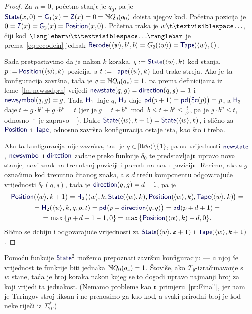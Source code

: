 \begin{proof}
Za $n=0$, početno stanje je $q_0$, pa je $\f{State}(x,0)=\f G_1(x)=\f Z(x)=0=\N Q_0(q_0)$ doista njegov kod. Početna pozicija je $0=\f Z(x)=\f G_2(x)=\f{Position}(x,0)$. Početna traka je $w\bl\ldots$, čiji kod $\knk{w\bl\ldots}$ je prema~\eqref{eq:recodein} jednak $\f{Recode}(\kr w,b',b)=G_3(\kr w)=\f{Tape}(\kr w,0)$.

Sada pretpostavimo da je nakon $k$ koraka, $q:=\f{State}(\kr w,k)$ kod stanja, $p:=\f{Position}(\kr w,k)$ pozicija, a $t:=\f{Tape}(\kr w,k)$ kod trake stroja. Ako je ta konfiguracija završna, tada je $q={\mathbb N} Q_0(q_z)=1$, pa prema definicijama iz leme~\ref{lm:newssdprn} vrijedi $\f{newstate}(q,g)=\f{direction}(q,g)=1$ i $\f{newsymbol}(q,g)=g$. Tada $\f H_1$ daje $q$, $\f H_2$ daje $\f{pd}(p+1)=\f{pd}\bigl(\f{Sc}(p)\bigr)=p$, a $\f H_3$ daje $t\dotminus g\cdot b^p+g\cdot b^p=t$ (jer je $g=t\div b^p\bmod b\le t\div b^p\le\frac{t}{b^p}$, pa je $g\cdot b^p\le t$, odnosno $\dotminus$ je zapravo $-$). Dakle $\f{State}(\kr w,k+1)=\f{State}(\kr w,k)$, i slično za $\f{Position}$ i $\f{Tape}$, odnosno završna konfiguracija ostaje ista, kao što i treba.

Ako ta konfiguracija nije završna, tad je $q\in[0\dd a\rangle\setminus\{1\}$, pa su vrijednosti $\f{newstate}$, $\f{newsymbol}$ i $\f{direction}$ zadane preko funkcije $\delta_0$ te predstavljaju upravo novo stanje, novi znak na trenutnoj poziciji i pomak na novu poziciju. Recimo, ako s $g$ označimo kod trenutno čitanog znaka, a s $d$ treću komponentu odgovarajuće vrijednosti $\delta_0(q,g)$, tada je $\f{direction}(q,g)=d+1$, pa je
\begin{multline}
    \f{Position}(\kr w,k+1)=\f H_2\bigl(\kr w,k,\f{State}(\kr w,k),\f{Position}(\kr w, k),\f{Tape}(\kr w,k)\bigr)=\\
    =\f H_2(\kr w,k,q,p,t)=
    \f{pd}\bigl(p+\f{direction}(q,g)\bigr)=\f{pd}(p+d+1)=\\
    =\max\,\{p+d+1-1,0\}=\max\,\{\f{Position}(\kr w,k)+d,0\}\text.
\end{multline}
Slično se dobiju i odgovarajuće vrijednosti za $\f{State}(\kr w,k+1)$ i $\f{Tape}(\kr w,k+1)$.
\end{proof}


Pomoću funkcije $\f{State}^2$ možemo prepoznati završnu konfiguraciju --- u njoj će vrijednost te funkcije biti jednaka ${\mathbb N} Q_0(q_z)=1$. Štoviše, ako $\mathcal T_0$-izračunavanje s $w$ stane, tada je broj koraka nakon kojeg se to dogodi upravo najmanji broj za koji vrijedi ta jednakost. (Nemamo probleme kao u primjeru~\ref{pr:Final'}, jer nam je Turingov stroj fiksan i ne prenosimo ga kao kod, a svaki prirodni broj je kod neke riječi iz $\Sigma_0^*$.)

